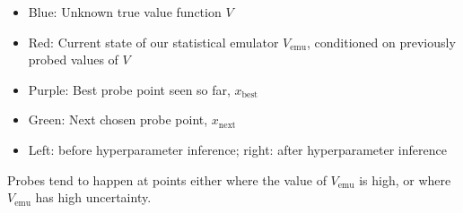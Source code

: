 \documentclass[a0,portrait]{a0poster}
\newcommand{\emu}{{\textrm{emu}}}
\newcommand{\rmnext}{{\textrm{next}}}
\newcommand{\best}{{\textrm{best}}}
\begin{document}
\begin{multicols}{3}
\begin{itemize}
  \item Blue: Unknown true value function $V$
  \item Red: Current state of our statistical emulator $V_\emu$, conditioned on previously probed values of $V$
  \item Purple: Best probe point seen so far, $x_\best$
  \item Green: Next chosen probe point, $x_\rmnext$
  \item Left: before hyperparameter inference; right: after hyperparameter inference
\end{itemize}
Probes tend to happen at points either where the value of $V_\emu$ is high, or where $V_\emu$ has high uncertainty.

     
     
%

   




\color{DarkSlateGray} %





\end{multicols}
\end{document}
